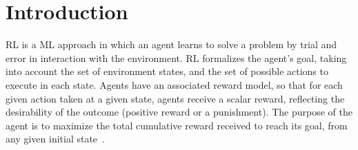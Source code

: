 
\section{Introduction}
\label{sec:introduction}

\acf{RL} is a \ac{ML} approach in which an agent learns to solve a problem by trial and error in 
interaction with the environment. \ac{RL} formalizes the agent’s goal, taking into account the set 
of environment states, and the set of possible actions to execute in each state. Agents have an 
associated reward model, so that for each given action taken at a given state, agents receive a 
scalar reward, reflecting the desirability of the outcome (\ie positive reward or a punishment). 
The purpose of the agent is to maximize the total cumulative reward received to reach its goal, 
from any given initial state~\cite{sutton98}.




\endinput

